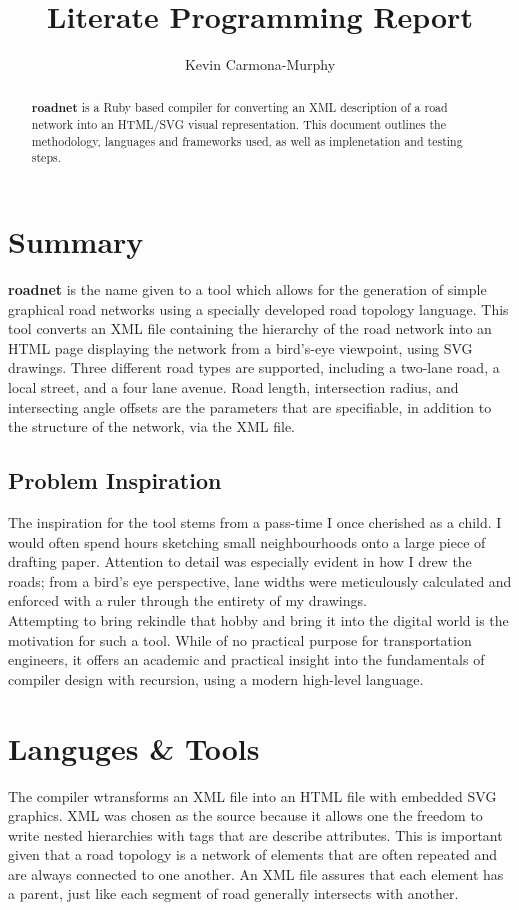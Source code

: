 \documentclass{article}
\begin{document}
\title{Literate Programming Report}
\author{Kevin Carmona-Murphy}

\maketitle

\begin{abstract}
\textbf{roadnet} is a Ruby based compiler for converting an XML description of a road network into an HTML/SVG visual representation. This document outlines the methodology, languages and frameworks used, as well as implenetation and testing steps.
\end{abstract}

\section{Summary}
\textbf{roadnet} is the name given to a tool which allows for the generation of simple graphical road networks using a specially developed road topology language. This tool converts an XML file containing the hierarchy of the road network into an HTML page displaying the network from a bird's-eye viewpoint, using SVG drawings. Three different road types are supported, including a two-lane road, a local street, and a four lane avenue. Road length, intersection radius, and intersecting angle offsets are the parameters that are specifiable, in addition to the structure of the network, via the XML file.

\subsection{Problem Inspiration}
The inspiration for the tool stems from a pass-time I once cherished as a child. I would often spend hours sketching small neighbourhoods onto a large piece of drafting paper. Attention to detail was especially evident in how I drew the roads; from a bird's eye perspective, lane widths were meticulously calculated and enforced with a ruler through the entirety of my drawings.\\

Attempting to bring rekindle that hobby and bring it into the digital world is the motivation for such a tool. While of no practical purpose for transportation engineers, it offers an academic and practical insight into the fundamentals of compiler design with recursion, using a modern high-level language.

\section{Languges \& Tools}
The compiler wtransforms an XML file into an HTML file with embedded SVG graphics. XML was chosen as the source because it allows one the freedom to write nested hierarchies with tags that are describe attributes. This is important given that a road topology is a network of elements that are often repeated and are always connected to one another. An XML file assures that each element has a parent, just like each segment of road generally intersects with another.\\
\end{document}
